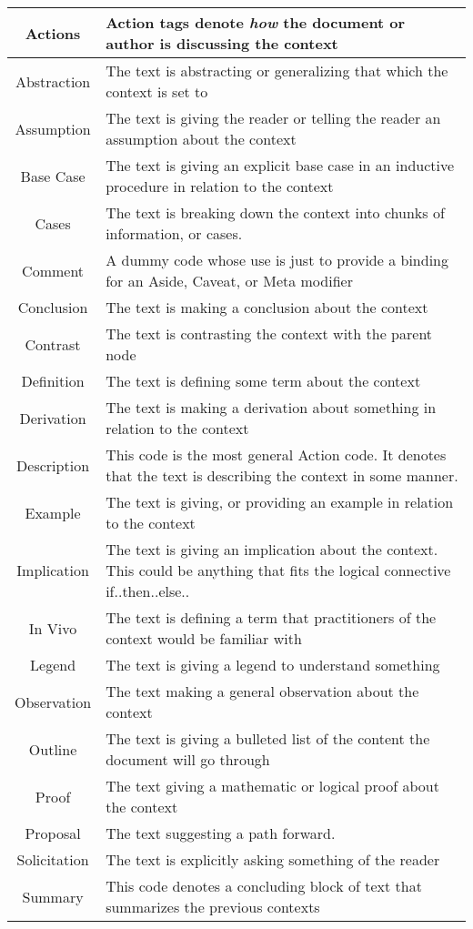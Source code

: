 \begin{table}[h!]
\begin{tabular}{c p{1.8\linewidth}}
    
    \textbf{Actions} & Action tags denote \emph{how} the document or author is discussing the context\\
    \hline
    Abstraction & The text is abstracting or generalizing that which the context is set to\\
    Assumption & The text is giving the reader or telling the reader an assumption about the context \\
    Base Case & The text is giving an explicit base case in an inductive procedure in relation to the context\\
    Cases & The text is breaking down the context into chunks of information, or cases.\\
    Comment & A dummy code whose use is just to provide a binding for an Aside, Caveat, or Meta modifier\\
    Conclusion & The text is making a conclusion about the context\\
    Contrast &  The text is contrasting the context with the parent node \\
    Definition & The text is defining some term about the context\\
    Derivation & The text is making a derivation about something in relation to the context\\
    Description & This code is the most general Action code. It denotes that the text is describing the context in some manner.\\
    Example & The text is giving, or providing an example in relation to the context\\
    Implication & The text is giving an implication about the context. This could be anything that fits the logical connective if..then..else..\\
    In Vivo & The text is defining a term that practitioners of the context would be familiar with\\
    Legend & The text is giving a legend to understand something\\
    Observation & The text making a general observation about the context\\
    Outline & The text is giving a bulleted list of the content the document will go through\\
    Proof & The text giving a mathematic or logical proof about the context\\
    Proposal & The text suggesting a path forward.\\
    Solicitation & The text is explicitly asking something of the reader\\
    Summary & This code denotes a concluding block of text that summarizes the previous contexts\\


\end{tabular}
\end{table}
